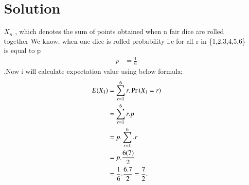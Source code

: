 \documentclass[journal,12pt,twocolumn]{IEEEtran}
\begin{document}
\section{Solution}
$X_{n}$ , which denotes the sum of points obtained when n fair dice are rolled together
We know, when one dice is rolled probability i.e  for all r in \{1,2,3,4,5,6\} is equal to p
\begin{align}
    p&=\frac{1}{6}
\end{align}
,Now i will calculate expectation value
using below formula;
\begin{align}
 E( X_{1})&=  \sum_{r=1}^6 r.\Pr\left(X_{1}=r\right)
 \label{eq:eq1}
\\
&=\sum_{r=1}^6 r.p
\\
&=p.\sum_{r=1}^6 .r
\\
&=p.\frac{6(7)}{2} 
\\
&=\frac{1}{6}.\frac{6.7}{2}=\frac{7}{2}.
\end{align}
\end{document}
